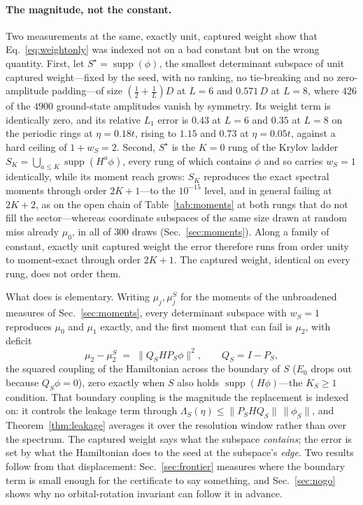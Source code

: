 \paragraph{The magnitude, not the constant.}
Two measurements at the same, exactly unit, captured weight show that Eq.~\eqref{eq:weightonly} was indexed
not on a bad constant but on the wrong quantity. First, let $S^\star=\operatorname{supp}(\phi)$, the
smallest determinant subspace of unit captured weight---fixed by the seed, with no ranking, no
tie-breaking and no zero-amplitude padding---of size $(\tfrac12+\tfrac1L)D$ at $L=6$ and $0.571\,D$ at $L=8$, where $426$ of the $4900$ ground-state amplitudes vanish by symmetry. Its weight term
is identically zero, and its relative $L_1$ error is $0.43$ at $L=6$ and $0.35$ at $L=8$ on the periodic rings at $\eta=0.18t$, rising to $1.15$ and $0.73$ at $\eta=0.05t$, against a hard ceiling of $1+w_S=2$.
Second, $S^\star$ is the $K=0$ rung of the Krylov ladder
$S_K=\bigcup_{a\le K}\operatorname{supp}(H^{a}\phi)$, every rung of which contains $\phi$ and so carries
$w_S=1$ identically, while its moment reach grows: $S_K$ reproduces the exact spectral moments through
order $2K{+}1$---to the $10^{-15}$ level, and in general failing at $2K{+}2$, as on the open chain of
Table~\ref{tab:moments} at both rungs that do not fill the sector---whereas coordinate
subspaces of the same size drawn at random miss already $\mu_0$, in all of $300$ draws
(Sec.~\ref{sec:moments}). Along a family of constant, exactly unit captured weight the error therefore
runs from order unity to moment-exact through order $2K{+}1$. The captured weight, identical on every
rung, does not order them.

What does is elementary. Writing $\mu_j,\mu^{S}_j$ for the moments of the unbroadened measures of
Sec.~\ref{sec:moments}, every determinant subspace with $w_S=1$ reproduces $\mu_0$ and $\mu_1$ exactly,
and the first moment that can fail is $\mu_2$, with deficit
\begin{equation}
\mu_2-\mu^{S}_2\;=\;\lVert Q_S H P_S\phi\rVert^{2},\qquad Q_S=I-P_S ,
\label{eq:mu2}
\end{equation}
the squared coupling of the Hamiltonian across the boundary of $S$ ($E_0$ drops out because
$Q_S\phi=0$), zero exactly when $S$ also holds $\operatorname{supp}(H\phi)$---the $K_S\ge1$ condition.
That boundary coupling is the magnitude the replacement is indexed on: it controls the leakage term
through $\Lambda_S(\eta)\le\lVert P_SHQ_S\rVert\,\lVert\phi_S\rVert$, and Theorem~\ref{thm:leakage}
averages it over the resolution window rather than over the spectrum. The captured weight says what the
subspace \emph{contains}; the error is set by what the Hamiltonian does to the seed at the subspace's
\emph{edge}. Two results follow from that displacement: Sec.~\ref{sec:frontier} measures
where the boundary term is small enough for the certificate to say something, and Sec.~\ref{sec:nogo}
shows why no orbital-rotation invariant can follow it in advance.


